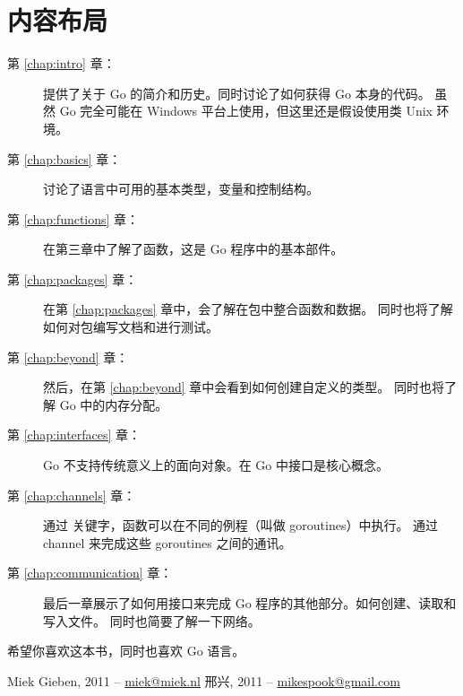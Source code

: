 \section*{内容布局}
\begin{description}
\item[第 \ref{chap:intro} 章：]
提供了关于 Go 的简介和历史。同时讨论了如何获得 Go 本身的代码。
虽然 Go 完全可能在 Windows 平台上使用，但这里还是假设使用类 Unix 环境。

\item[第 \ref{chap:basics} 章：]
讨论了语言中可用的基本类型，变量和控制结构。

\item[第 \ref{chap:functions} 章：]
在第三章中了解了函数，这是 Go 程序中的基本部件。

\item[第 \ref{chap:packages} 章：]
在第 \ref{chap:packages} 章中，会了解在包中整合函数和数据。
同时也将了解如何对包编写文档和进行测试。

\item[第 \ref{chap:beyond} 章：]
然后，在第 \ref{chap:beyond} 章中会看到如何创建自定义的类型。
同时也将了解 Go 中的内存分配。

\item[第 \ref{chap:interfaces} 章：]
Go 不支持传统意义上的面向对象。在 Go 中接口是核心概念。

\item[第 \ref{chap:channels} 章：]
通过  关键字，函数可以在不同的例程（叫做 goroutines）中执行。
通过 channel 来完成这些 goroutines 之间的通讯。

\item[第 \ref{chap:communication} 章：]
最后一章展示了如何用接口来完成 Go 程序的其他部分。如何创建、读取和写入文件。
同时也简要了解一下网络。
\end{description}

希望你喜欢这本书，同时也喜欢 Go 语言。

\begin{raggedright}
Miek Gieben, 2011 -- \url{miek@miek.nl}
邢兴, 2011 -- \url{mikespook@gmail.com}
\end{raggedright}
